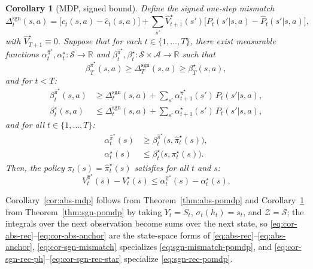 \documentclass[10pt]{article}
\newtheorem{corollary}{Corollary}
\theoremstyle{definition}
\newcommand{\Dsgn}{\Delta^{\mathrm{sgn}}}
\begin{document}
\begin{corollary}[MDP, signed bound]\label{cor:sgn-mdp}
Define the signed one-step mismatch
\begin{equation}
\Dsgn_t(s,a) = \bigl[c_t(s,a) - \hat c_t(s,a)\bigr]
+ \sum_{s'} \hat V^\star_{t+1}(s')
  \bigl[P_t(s'|s,a) - \hat P_t(s'|s,a)\bigr],
\label{eq:cor-sgn-mismatch}
\end{equation}
with $\hat V^\star_{T+1} \equiv 0$. Suppose that for each
$t \in \{1, \dots, T\}$, there exist measurable functions
$\alpha^{\hat\pi^\star}_t, \alpha^\star_t : \mathcal{S} \to \mathbb{R}$
and $\beta^{\hat\pi^\star}_t, \beta^\star_t : \mathcal{S} \times
\mathcal{A} \to \mathbb{R}$ such that
\begin{equation}
\beta^{\hat\pi^\star}_T(s,a) \ge \Dsgn_T(s,a) \ge \beta^\star_T(s,a),
\label{eq:cor-sgn-terminal}
\end{equation}
and for $t < T$:
\begin{align}
\beta^{\hat\pi^\star}_t(s,a) &\ge \Dsgn_t(s,a)
+ \sum_{s'} \alpha^{\hat\pi^\star}_{t+1}(s')\, P_t(s'|s,a),
\label{eq:cor-sgn-rec-ph}\\
\beta^{\star}_t(s,a) &\le \Dsgn_t(s,a)
+ \sum_{s'} \alpha^{\star}_{t+1}(s')\, P_t(s'|s,a),
\label{eq:cor-sgn-rec-star}
\end{align}
and for all $t \in \{1, \dots, T\}$:
\begin{align}
\alpha^{\hat\pi^\star}_t(s)
&\ge \beta^{\hat\pi^\star}_t\bigl(s, \hat\pi^\star_t(s)\bigr),
\label{eq:cor-sgn-anchor-ph}\\
\alpha^{\star}_t(s)
&\le \beta^{\star}_t\bigl(s, \pi^\star_t(s)\bigr).
\label{eq:cor-sgn-anchor-star}
\end{align}
Then, the policy $\pi_t(s) = \hat\pi^\star_t(s)$ satisfies for all $t$
and $s$:
\[
V^{\hat\pi^\star}_t(s) - V^\star_t(s)
\le \alpha^{\hat\pi^\star}_t(s) - \alpha^{\star}_t(s).
\]
\end{corollary}

Corollary~\ref{cor:abs-mdp} follows from Theorem~\ref{thm:abs-pomdp}
and Corollary~\ref{cor:sgn-mdp} from Theorem~\ref{thm:sgn-pomdp} by
taking $Y_t = S_t$, $\sigma_t(h_t) = s_t$, and $\mathcal{Z} =
\mathcal{S}$; the integrals over the next observation become sums over
the next state, so
\eqref{eq:cor-abs-rec}--\eqref{eq:cor-abs-anchor} are the state-space
forms of \eqref{eq:abs-rec}--\eqref{eq:abs-anchor},
\eqref{eq:cor-sgn-mismatch} specializes
\eqref{eq:sgn-mismatch-pomdp}, and
\eqref{eq:cor-sgn-rec-ph}--\eqref{eq:cor-sgn-rec-star} specialize
\eqref{eq:sgn-rec-pomdp}.
\end{document}
